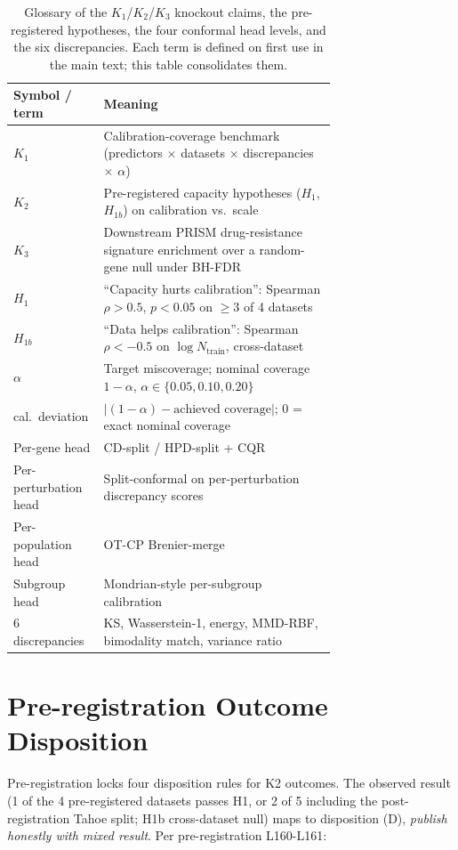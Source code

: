 \documentclass{article}
\begin{document}
\begin{table}[h]
\centering
\small
\begin{tabular}{@{}l p{0.72\linewidth}@{}}
\toprule
Symbol / term & Meaning \\
\midrule
$K_1$ & Calibration-coverage benchmark (predictors $\times$ datasets $\times$ discrepancies $\times$ $\alpha$) \\
$K_2$ & Pre-registered capacity hypotheses ($H_1$, $H_{1b}$) on calibration vs.\ scale \\
$K_3$ & Downstream PRISM drug-resistance signature enrichment over a random-gene null under BH-FDR \\
$H_1$ & ``Capacity hurts calibration'': Spearman $\rho>0.5$, $p<0.05$ on $\geq 3$ of 4 datasets \\
$H_{1b}$ & ``Data helps calibration'': Spearman $\rho<-0.5$ on $\log N_{\text{train}}$, cross-dataset \\
$\alpha$ & Target miscoverage; nominal coverage $1-\alpha$, $\alpha \in \{0.05, 0.10, 0.20\}$ \\
cal.\ deviation & $|(1-\alpha) - \text{achieved coverage}|$; $0$ = exact nominal coverage \\
Per-gene head & CD-split / HPD-split \citep{izbicki2022} + CQR \citep{romano2019} \\
Per-perturbation head & Split-conformal on per-perturbation discrepancy scores \citep{vovk2012} \\
Per-population head & OT-CP Brenier-merge \citep{otcp2025} \\
Subgroup head & Mondrian-style per-subgroup calibration \citep{cauchois2021} \\
6 discrepancies & KS, Wasserstein-1, energy, MMD-RBF, bimodality match, variance ratio \\
\bottomrule
\end{tabular}
\caption{Glossary of the $K_1$/$K_2$/$K_3$ knockout claims, the pre-registered
hypotheses, the four conformal head levels, and the six discrepancies. Each
term is defined on first use in the main text; this table consolidates them.}
\label{tab:glossary}
\end{table}

\section{Pre-registration Outcome Disposition}
\label{app:prereg}

Pre-registration locks four disposition rules for K2 outcomes. The observed result (1 of the 4 pre-registered datasets passes H1, or 2 of 5 including the post-registration Tahoe split; H1b cross-dataset null) maps to disposition (D), \emph{publish honestly with mixed result}. Per pre-registration L160-L161:
\end{document}
